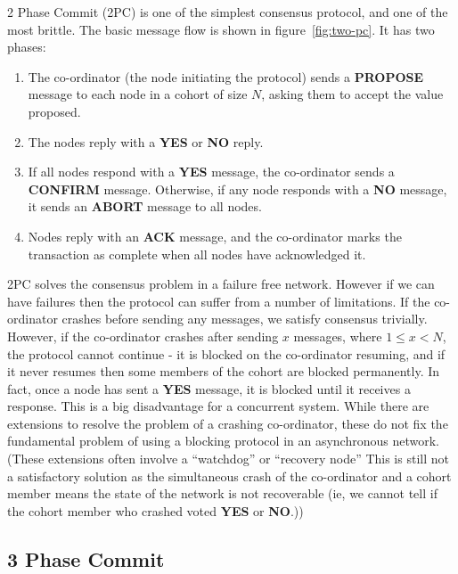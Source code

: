 \documentclass[12pt,twoside,notitlepage]{report}
\newcommand{\msg}[1] {{\bf #1}}         %
\begin{document}
2 Phase Commit (2PC) is one of the simplest consensus protocol, and one of the most brittle. The
basic message flow is shown in figure~\ref{fig:two-pc}. It has two phases:

\begin{enumerate}
\item The co-ordinator (the node initiating the protocol) sends a \msg{PROPOSE} message to each
	node in a cohort of size $N$, asking them to accept the value proposed.
\item The nodes reply with a \msg{YES} or \msg{NO} reply.
\item If all nodes respond with a \msg{YES} message, the co-ordinator sends a \msg{CONFIRM} message. Otherwise, if
	any node responds with a \msg{NO} message, it sends an \msg{ABORT} message to all nodes.
\item Nodes reply with an \msg{ACK} message, and the co-ordinator marks the transaction as
	complete when all nodes have acknowledged it.
\end{enumerate}


2PC solves the consensus problem in a failure free network. However if we can have failures then
the protocol can suffer from a number of limitations. If the co-ordinator crashes before sending
any messages, we satisfy consensus trivially. However, if the co-ordinator crashes after sending
$x$ messages, where $1 \le x < N$, the protocol cannot continue - it is blocked on the
co-ordinator resuming, and if it never resumes then some members of the cohort are blocked
permanently. In fact, once a node has sent a \msg{YES} message, it is blocked until it receives a
response. This is a big disadvantage for a concurrent system. While there are extensions to
resolve the problem of a crashing co-ordinator, these do not fix the fundamental problem of using
a blocking protocol in an asynchronous network. (These extensions often involve a ``watchdog'' or
``recovery node'' This is still not a satisfactory solution as the simultaneous crash of the
co-ordinator and a cohort member means the state of the network is not recoverable (ie, we cannot
tell if the cohort member who crashed voted \msg{YES} or \msg{NO}.))

\subsection*{3 Phase Commit}
\end{document}
